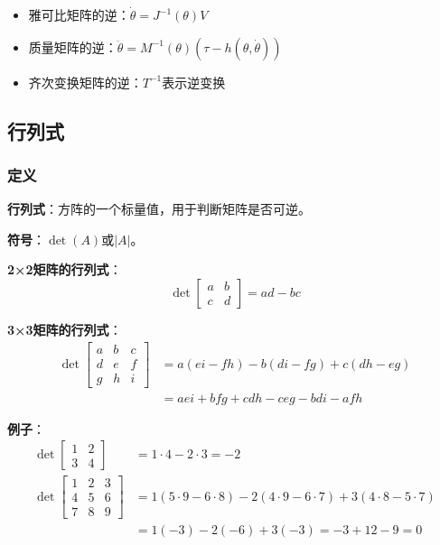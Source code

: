 \documentclass[12pt,a4paper]{article}
\begin{document}
\begin{itemize}
\item 雅可比矩阵的逆：$\dot{\theta} = J^{-1}(\theta) V$
\item 质量矩阵的逆：$\ddot{\theta} = M^{-1}(\theta)(\tau - h(\theta, \dot{\theta}))$
\item 齐次变换矩阵的逆：$T^{-1}$表示逆变换
\end{itemize}

\subsection{行列式}

\subsubsection{定义}

\textbf{行列式}：方阵的一个标量值，用于判断矩阵是否可逆。

\textbf{符号}：$\det(A)$或$|A|$。

\textbf{2×2矩阵的行列式}：
\begin{equation}
\det\begin{bmatrix} a & b \\ c & d \end{bmatrix} = ad - bc
\end{equation}

\textbf{3×3矩阵的行列式}：
\begin{align}
\det\begin{bmatrix} a & b & c \\ d & e & f \\ g & h & i \end{bmatrix} &= a(ei - fh) - b(di - fg) + c(dh - eg) \\
&= aei + bfg + cdh - ceg - bdi - afh
\end{align}

\textbf{例子}：
\begin{align}
\det\begin{bmatrix} 1 & 2 \\ 3 & 4 \end{bmatrix} &= 1 \cdot 4 - 2 \cdot 3 = -2 \\
\det\begin{bmatrix} 1 & 2 & 3 \\ 4 & 5 & 6 \\ 7 & 8 & 9 \end{bmatrix} &= 1(5 \cdot 9 - 6 \cdot 8) - 2(4 \cdot 9 - 6 \cdot 7) + 3(4 \cdot 8 - 5 \cdot 7) \\
&= 1(-3) - 2(-6) + 3(-3) = -3 + 12 - 9 = 0
\end{align}
\end{document}
